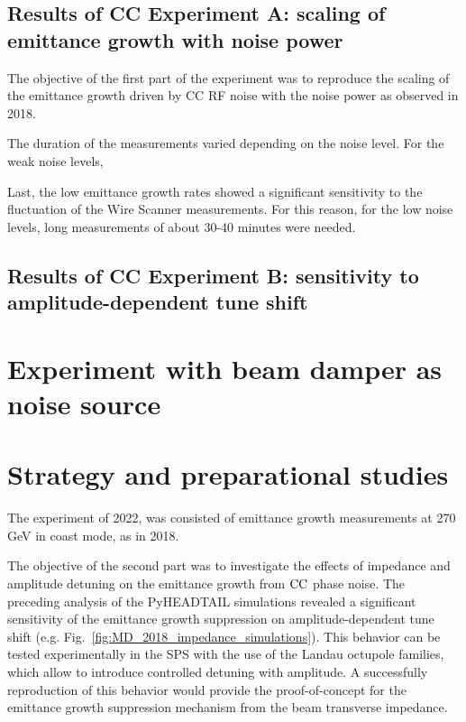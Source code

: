 \subsection{Results of CC Experiment A: scaling of emittance growth with noise power}

The objective of the first part of the experiment was to reproduce the scaling of the emittance growth driven by CC RF noise with the noise power as observed in 2018. 

The duration of the measurements varied depending on the noise level. For the weak noise levels, 


Last, the low emittance growth rates showed a significant sensitivity to the fluctuation of the Wire Scanner measurements. For this reason, for the low noise levels, long measurements of about 30-40 minutes were needed.
\subsection{Results of CC Experiment B: sensitivity to amplitude-dependent tune shift} 

\section{Experiment with beam damper as noise source}



\newpage

\section{Strategy and preparational studies}\label{sec:strategy_md_2022}
The experiment of 2022, was consisted of emittance growth measurements at 270\,GeV in coast mode, as in 2018. 

The objective of the second part was to investigate the effects of impedance and amplitude detuning on the emittance growth from ${\mathrm{CC}}$ phase noise. The preceding analysis of the PyHEADTAIL simulations revealed a significant sensitivity of the emittance growth suppression on amplitude-dependent tune shift (e.g. Fig.~\ref{fig:MD_2018_impedance_simulations}). This behavior can be tested experimentally in the SPS with the use of the Landau octupole families, which allow to introduce controlled detuning with amplitude. A successfully reproduction of this behavior would provide the proof-of-concept for the emittance growth suppression mechanism from the beam transverse impedance.




